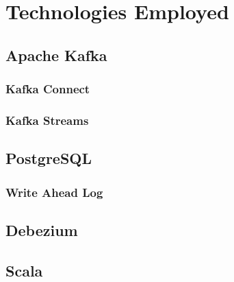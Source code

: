 \chapter{Technologies Employed}
\label{cha:techs}

\section{Apache Kafka}

\subsection{Kafka Connect}

\subsection{Kafka Streams}

\section{PostgreSQL}

\subsection{Write Ahead Log}

\section{Debezium}

\section{Scala}
